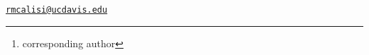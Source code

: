 \address{%
Victoria S. Farrar\\
University of California, Davis\\
\\
}


\address{%
April Booth\\
University of California, Davis\\
\\
}


\address{%
Tanner Feustel\\
University of California, Davis\\
\\
}


\address{%
Matthew D. MacManes\\
University of New Hampshire\\
\\
}


\address{%
Rebecca M. Calisi \footnote{corresponding author}\\
University of California, Davis\\
\\
}
\href{mailto:rmcalisi@ucdavis.edu}{\nolinkurl{rmcalisi@ucdavis.edu}}

